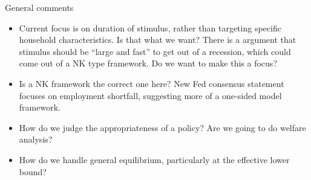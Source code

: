\documentclass[]{article}
\begin{document}
General comments
\begin{itemize}
	\item Current focus is on duration of stimulus, rather than targeting specific household characteristics. Is that what we want? There is a argument that stimulus should be ``large and fast'' to get out of a recession, which could come out of a NK type framework. Do we want to make this a focus?
	\item Is a NK framework the correct one here? New Fed consensus statement focuses on employment shortfall, suggesting more of a one-sided model framework.
	\item How do we judge the appropriateness of a policy? Are we going to do welfare analysis?
	\item How do we handle general equilibrium, particularly at the effective lower bound?
\end{itemize}
\end{document}

